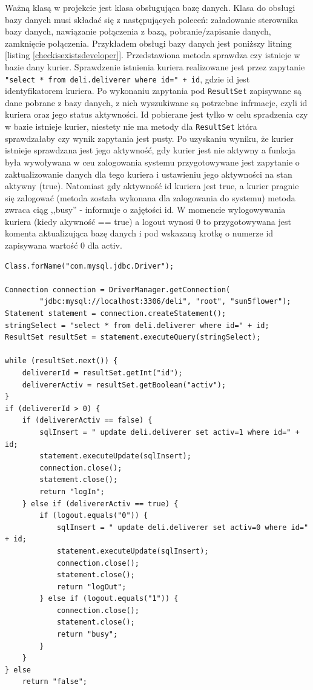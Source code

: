 \documentclass[eng,printmode,oneside]{mgr}
\begin{document}
Ważną klasą w projekcie jest klasa obsługująca bazę danych. Klasa do obsługi
bazy danych musi składać się z następujących poleceń: załadowanie sterownika
bazy danych, nawiązanie połączenia z bazą, pobranie/zapisanie danych, zamknięcie
połączenia. Przykładem obsługi bazy danych jest poniższy litning [listing
\ref{checkisexistsdeveloper}]. Przedstawiona metoda sprawdza czy istnieje w
bazie dany kurier. Sprawdzenie istnienia kuriera realizowane jest przez
zapytanie \texttt{"select * from deli.deliverer where id=" + id}, gdzie id jest
identyfikatorem kuriera. Po wykonaniu zapytania pod \texttt{ResultSet}
zapisywane są dane pobrane z bazy danych, z nich wyszukiwane są potrzebne infrmacje, czyli
id kuriera oraz jego status aktywności. Id pobierane jest tylko w celu
spradzenia czy w bazie istnieje kurier, niestety nie ma metody dla
\texttt{ResultSet} która sprawdzałaby czy wynik zapytania jest pusty. Po
uzyskaniu wyniku, że kurier istnieje sprawdzana jest jego aktywność, gdy kurier
jest nie aktywny a funkcja była wywoływana w ceu zalogowania systemu
przygotowywane jest zapytanie o zaktualizowanie danych dla tego kuriera i
ustawieniu jego aktywności na stan aktywny (true). Natomiast gdy aktywność
id kuriera jest true, a kurier pragnie się zalogować (metoda została wykonana
dla zalogowania do systemu) metoda zwraca ciąg ,,busy'' - informuje o zajętości id.
W momencie wylogowywania kuriera (kiedy akywność == true) a logout wynosi 0 to
przygotowywana jest komenta aktualizująca bazę danych i pod wskazaną krotkę o
numerze id zapisywana wartość 0 dla activ.

\begin{lstlisting}[caption=Przykład
połączenia z bazą danych na przykładzie metody sprawdzającej
istnienie kuriera oraz jego stan,label=checkisexistsdeveloper] 
Class.forName("com.mysql.jdbc.Driver");

Connection connection = DriverManager.getConnection(
		"jdbc:mysql://localhost:3306/deli", "root", "sun5flower");
Statement statement = connection.createStatement();
stringSelect = "select * from deli.deliverer where id=" + id;
ResultSet resultSet = statement.executeQuery(stringSelect);

while (resultSet.next()) {
	delivererId = resultSet.getInt("id");
	delivererActiv = resultSet.getBoolean("activ");
} 
if (delivererId > 0) {
	if (delivererActiv == false) {
		sqlInsert = " update deli.deliverer set activ=1 where id=" + id;
		statement.executeUpdate(sqlInsert);
		connection.close();
		statement.close();
		return "logIn";
	} else if (delivererActiv == true) {
		if (logout.equals("0")) {
			sqlInsert = " update deli.deliverer set activ=0 where id=" + id;
			statement.executeUpdate(sqlInsert);
			connection.close();
			statement.close();
			return "logOut";
		} else if (logout.equals("1")) {
			connection.close();
			statement.close();
			return "busy";
		}
	}
} else
	return "false";
\end{lstlisting}
\end{document}

